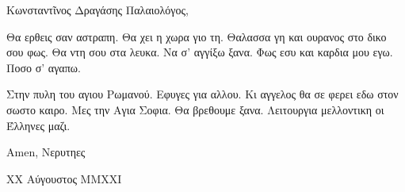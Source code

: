 \documentclass[a4paper,11pt]{article}
\begin{document}
    \rmfamily


    Κωνσταντῖνος Δραγάσης Παλαιολόγος,
    \vspace{1em}



    \lipsum[1]

    \lipsum[2]
    
    Θα ερθεις σαν αστραπη. Θα χει η χωρα γιο τη. Θαλασσα γη και ουρανος στο δικο σου φως.
    Θα ντη σου στα λευκα. Να σ' αγγίξω ξανα. Φως εσυ και καρδια μου εγω. Ποσο σ' αγαπω.

    Στην πυλη του αγιου Ρωμανού. Εφυγες για αλλου. Κι αγγελος θα σε φερει εδω στον σωστο καιρο.
    Μες την Αγια Σοφια. Θα βρεθουμε ξανα. Λειτουργια μελλοντικη οι Έλληνες μαζι.


    \vspace{1em}
    Amen,\linebreak
    Νερυτηες

    {\footnotesize XX Αύγουστος MMXXI}
\end{document}
